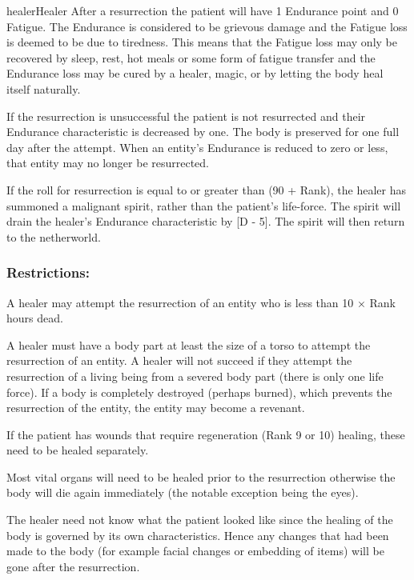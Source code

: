 \begin{Skill}[1.4]{healer}{Healer}
After a resurrection the patient will have 1 Endurance point and 0
Fatigue.  The Endurance is considered to be grievous damage and the
Fatigue loss is deemed to be due to tiredness. This means that the
Fatigue loss may only be recovered by sleep, rest, hot meals or some
form of fatigue transfer and the Endurance loss may be cured by a
healer, magic, or by letting the body heal itself naturally.

If the resurrection is unsuccessful the patient is not resurrected and
their Endurance characteristic is decreased by one.  The body is
preserved for one full day after the attempt. When an entity’s
Endurance is reduced to zero or less, that entity may no longer be
resurrected.

If the roll for resurrection is equal to or greater than (90 + Rank),
the healer has summoned a malignant spirit, rather than the patient’s
life-force. The spirit will drain the healer’s Endurance
characteristic by [D - 5].  The spirit will then return to the
netherworld.

\subsubsection{Restrictions:}
\begin{Itemize}
\item A healer may attempt the resurrection of an entity who is less
  than 10 × Rank hours dead.

\item A healer must have a body part at least the size of a torso to
  attempt the resurrection of an entity.  A healer will not succeed if
  they attempt the resurrection of a living being from a severed body
  part (there is only one life force).  If a body is completely
  destroyed (perhaps burned), which prevents the resurrection of the
  entity, the entity may become a revenant.

\item If the patient has wounds that require regeneration (Rank 9 or
  10) healing, these need to be healed separately.

\item Most vital organs will need to be healed prior to the
  resurrection otherwise the body will die again immediately (the
  notable exception being the eyes).

\item The healer need not know what the patient looked like since the
  healing of the body is governed by its own characteristics.  Hence
  any changes that had been made to the body (for example facial
  changes or embedding of items) will be gone after the resurrection.


\end{Itemize}
\end{Skill}
